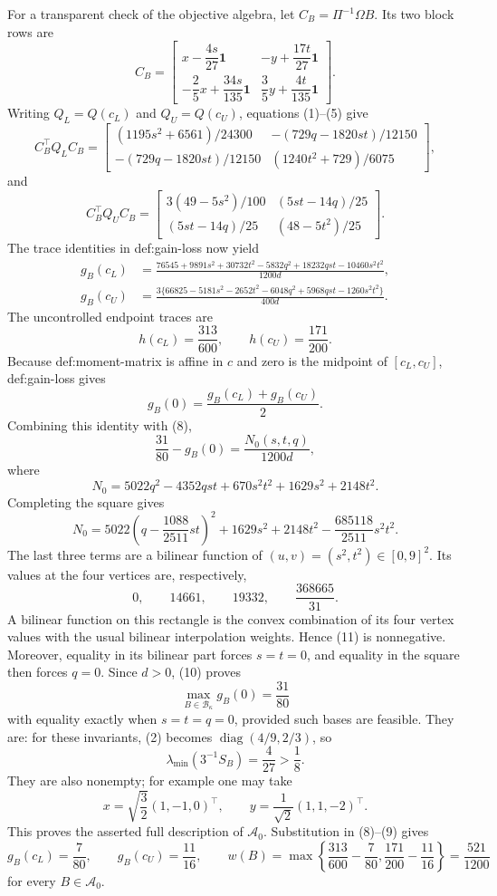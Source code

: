 For a transparent check of the objective algebra, let \(C_B=\Pi^{-1}\Omega B\).  Its two block rows are
\[
 C_B=
 \begin{bmatrix}
 x-\dfrac{4s}{27}\mathbf1&-y+\dfrac{17t}{27}\mathbf1\\[3pt]
 -\dfrac25x+\dfrac{34s}{135}\mathbf1&\dfrac35y+\dfrac{4t}{135}\mathbf1
 \end{bmatrix}.
 \tag{5}
\]
Writing \(Q_L=Q(c_L)\) and \(Q_U=Q(c_U)\), equations (1)--(5) give
\[
 C_B^{\top}Q_LC_B=
 \begin{bmatrix}
 (1195s^2+6561)/24300&-(729q-1820st)/12150\\
 -(729q-1820st)/12150&(1240t^2+729)/6075
 \end{bmatrix},
 \tag{6}
\]
and
\[
 C_B^{\top}Q_UC_B=
 \begin{bmatrix}
 3(49-5s^2)/100&(5st-14q)/25\\
 (5st-14q)/25&(48-5t^2)/25
 \end{bmatrix}.
 \tag{7}
\]
The trace identities in def:gain-loss now yield
\[
 \begin{split}
 g_B(c_L)
 &=\frac{76545+9891s^2+30732t^2-5832q^2+18232qst-10460s^2t^2}{1200d},\\
 g_B(c_U)
 &=\frac{3\{66825-5181s^2-2652t^2-6048q^2+5968qst-1260s^2t^2\}}{400d}.
 \end{split}
 \tag{8}
\]
The uncontrolled endpoint traces are
\[
 h(c_L)=\frac{313}{600},
 \qquad
 h(c_U)=\frac{171}{200}.
 \tag{9}
\]
Because def:moment-matrix is affine in \(c\) and zero is the midpoint of \([c_L,c_U]\), def:gain-loss gives
\[
 g_B(0)=\frac{g_B(c_L)+g_B(c_U)}2.
\]
Combining this identity with (8),
\[
 \frac{31}{80}-g_B(0)=\frac{N_0(s,t,q)}{1200d},
 \tag{10}
\]
where
\[
 N_0=5022q^2-4352qst+670s^2t^2+1629s^2+2148t^2.
\]
Completing the square gives
\[
 N_0
 =5022\left(q-\frac{1088}{2511}st\right)^2
 +1629s^2+2148t^2-\frac{685118}{2511}s^2t^2.
 \tag{11}
\]
The last three terms are a bilinear function of \((u,v)=(s^2,t^2)\in[0,9]^2\).  Its values at the four vertices are, respectively,
\[
 0,
 \qquad14661,
 \qquad19332,
 \qquad\frac{368665}{31}.
\]
A bilinear function on this rectangle is the convex combination of its four vertex values with the usual bilinear interpolation weights.  Hence (11) is nonnegative.  Moreover, equality in its bilinear part forces \(s=t=0\), and equality in the square then forces \(q=0\).  Since \(d>0\), (10) proves
\[
 \max_{B\in\mathcal B_\kappa}g_B(0)=\frac{31}{80}
\]
with equality exactly when \(s=t=q=0\), provided such bases are feasible.  They are: for these invariants, (2) becomes \(\operatorname{diag}(4/9,2/3)\), so
\[
 \lambda_{\min}(3^{-1}S_B)=\frac4{27}>\frac18.
 \tag{12}
\]
They are also nonempty; for example one may take
\[
 x=\sqrt{\frac32}(1,-1,0)^{\top},
 \qquad
 y=\frac1{\sqrt2}(1,1,-2)^{\top}.
\]
This proves the asserted full description of \(\mathcal A_0\).  Substitution in (8)--(9) gives
\[
 g_B(c_L)=\frac7{80},
 \qquad
 g_B(c_U)=\frac{11}{16},
 \qquad
 w(B)=\max\left\{\frac{313}{600}-\frac7{80},
 \frac{171}{200}-\frac{11}{16}\right\}
 =\frac{521}{1200}
 \tag{13}
\]
for every \(B\in\mathcal A_0\).

